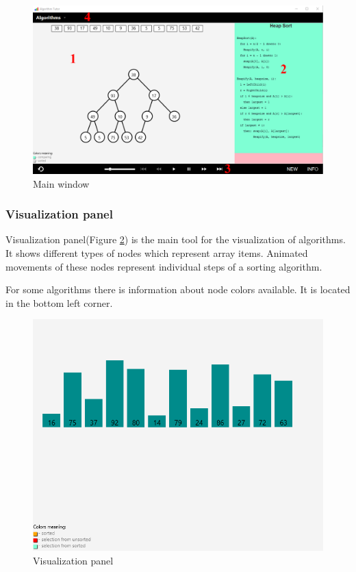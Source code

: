 \documentclass[
  field=inf,
  biblatex,
  language=english,
  glossaries,
  theorems=false,
  index
]{kidiplom}
\begin{document}
\begin{figure}[H]
\begin{center}
	
	\includegraphics[width=\textwidth]{img/UI.png}
	\caption{Main window}\label{fig:ui}
\end{center}
\end{figure}

\subsubsection{Visualization panel}
Visualization panel(Figure \ref{fig:vispanel}) is the main tool for the visualization of algorithms. It shows different types of nodes which represent array items. Animated movements of these nodes represent individual steps of a sorting algorithm. 

For some algorithms there is information about node colors available. It is located in the bottom left corner.

\begin{figure}[H]
\begin{center}
	
	\includegraphics[scale=0.4]{img/ui/Vispanel.png}
	\caption{Visualization panel}\label{fig:vispanel}
\end{center}
\end{figure}
\end{document}
